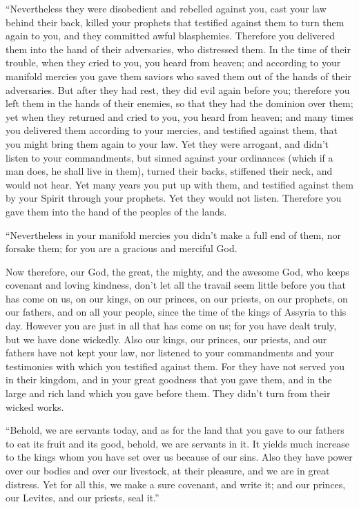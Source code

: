  ``Nevertheless they were disobedient and rebelled
against you, cast your law behind their back, killed your prophets that
testified against them to turn them again to you, and they committed
awful blasphemies.  Therefore you delivered them into the
hand of their adversaries, who distressed them. In the time of their
trouble, when they cried to you, you heard from heaven; and according to
your manifold mercies you gave them saviors who saved them out of the
hands of their adversaries.  But after they had rest,
they did evil again before you; therefore you left them in the hands of
their enemies, so that they had the dominion over them; yet when they
returned and cried to you, you heard from heaven; and many times you
delivered them according to your mercies,  and testified
against them, that you might bring them again to your law. Yet they were
arrogant, and didn't listen to your commandments, but sinned against
your ordinances (which if a man does, he shall live in them), turned
their backs, stiffened their neck, and would not hear. 
Yet many years you put up with them, and testified against them by your
Spirit through your prophets. Yet they would not listen. Therefore you
gave them into the hand of the peoples of the lands.

 ``Nevertheless in your manifold mercies you didn't make
a full end of them, nor forsake them; for you are a gracious and
merciful God.

 Now therefore, our God, the great, the mighty, and the
awesome God, who keeps covenant and loving kindness, don't let all the
travail seem little before you that has come on us, on our kings, on our
princes, on our priests, on our prophets, on our fathers, and on all
your people, since the time of the kings of Assyria to this day.
 However you are just in all that has come on us; for you
have dealt truly, but we have done wickedly.  Also our
kings, our princes, our priests, and our fathers have not kept your law,
nor listened to your commandments and your testimonies with which you
testified against them.  For they have not served you in
their kingdom, and in your great goodness that you gave them, and in the
large and rich land which you gave before them. They didn't turn from
their wicked works.

 ``Behold, we are servants today, and as for the land
that you gave to our fathers to eat its fruit and its good, behold, we
are servants in it.  It yields much increase to the kings
whom you have set over us because of our sins. Also they have power over
our bodies and over our livestock, at their pleasure, and we are in
great distress.  Yet for all this, we make a sure
covenant, and write it; and our princes, our Levites, and our priests,
seal it.''

